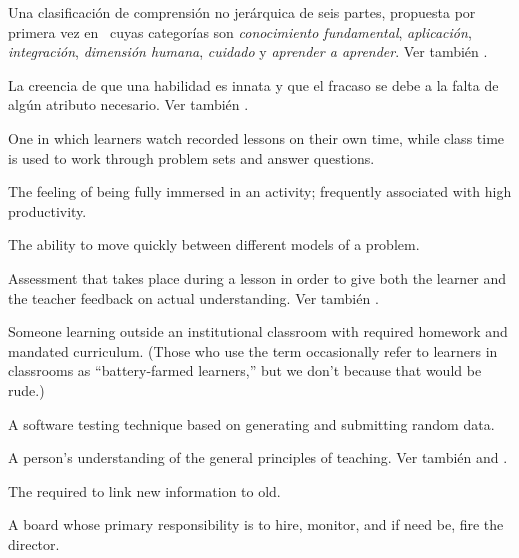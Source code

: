 \begin{description}
 Una clasificación de comprensión no jerárquica 
de seis partes, propuesta por primera vez en~\cite{Fink2013} cuyas categorías son \emph{conocimiento fundamental}, \emph{aplicación}, \emph{integración}, \emph{dimensión humana}, \emph{cuidado} y 
\emph{aprender a aprender}. Ver también .

 La creencia de que una habilidad es innata y que 
el fracaso se debe a la falta de algún atributo necesario. Ver también
.

 One in which learners watch
recorded lessons on their own time, while class time is used to work through
problem sets and answer questions.

 The feeling of being fully immersed in an activity;
frequently associated with high productivity.

 The ability to move
quickly between different models of a problem.

 Assessment that takes
place during a lesson in order to give both the learner and the teacher
feedback on actual understanding. Ver
también .

 Someone learning outside an
institutional classroom with required homework and mandated curriculum. (Those
who use the term occasionally refer to learners in classrooms as
``battery-farmed learners,'' but we don't because that would be rude.)

 A software testing technique based on
generating and submitting random data.

 A
person's understanding of the general principles of teaching. Ver también
and .

 The 
required to link new information to old.

 A board whose primary responsibility is
to hire, monitor, and if need be, fire the director.


\end{description}
